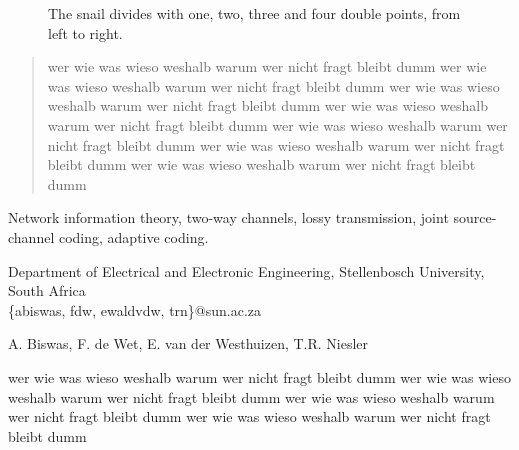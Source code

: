 \documentclass{IEEEtran}
\newcommand{\name}[1] {#1}
\newcommand{\address}[1] {#1}
\begin{document}
\author{\\
}

\begin{figure}[h]
\begin{center}
\def\svgwidth{300pt}

\caption{The snail divides with one, two, three and four double points, from left to right.}
\label{snaildivides}
\end{center}
\end{figure}






\maketitle
\begin{abstract}
  wer wie was wieso weshalb warum wer nicht fragt bleibt dumm   wer wie was wieso weshalb warum wer nicht fragt bleibt dumm
  wer wie was wieso weshalb warum wer nicht fragt bleibt dumm
  wer wie was wieso weshalb warum wer nicht fragt bleibt dumm
  wer wie was wieso weshalb warum wer nicht fragt bleibt dumm
  wer wie was wieso weshalb warum wer nicht fragt bleibt dumm
  wer wie was wieso weshalb warum wer nicht fragt bleibt dumm
\end{abstract}

\begin{IEEEkeywords}
  Network information theory, two-way channels, lossy transmission, joint source-channel coding, adaptive coding.
\end{IEEEkeywords}


\address{Department of Electrical and Electronic Engineering, Stellenbosch University, South Africa \\
         \{abiswas, fdw, ewaldvdw, trn\}@sun.ac.za}

\name{A. Biswas, F. de Wet, E. van der Westhuizen, T.R. Niesler}

\lipsum[3-10]
  wer wie was wieso weshalb warum wer nicht fragt bleibt dumm
  wer wie was wieso weshalb warum wer nicht fragt bleibt dumm
  wer wie was wieso weshalb warum wer nicht fragt bleibt dumm
  wer wie was wieso weshalb warum wer nicht fragt bleibt dumm
\end{document}
